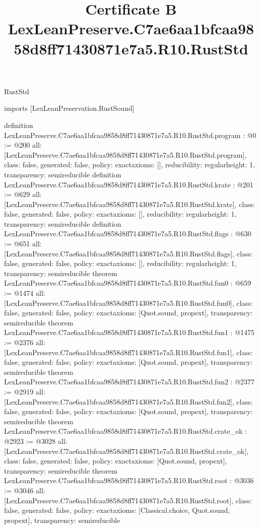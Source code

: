\begin{lexlean}{RustStd}
\title{Certificate B LexLeanPreserve.C7ae6aa1bfcaa9858d8ff71430871e7a5.R10.RustStd}
\begin{coremodule}
imports [LexLeanPreservation.RustSound]

definition LexLeanPreserve.C7ae6aa1bfcaa9858d8ff71430871e7a5.R10.RustStd.program : @0 := @200 {
  all: [LexLeanPreserve.C7ae6aa1bfcaa9858d8ff71430871e7a5.R10.RustStd.program],
  class: false,
  generated: false,
  policy: exact{axioms: []},
  reducibility: regular{height: 1},
  transparency: semireducible
}
definition LexLeanPreserve.C7ae6aa1bfcaa9858d8ff71430871e7a5.R10.RustStd.krate : @201 := @629 {
  all: [LexLeanPreserve.C7ae6aa1bfcaa9858d8ff71430871e7a5.R10.RustStd.krate],
  class: false,
  generated: false,
  policy: exact{axioms: []},
  reducibility: regular{height: 1},
  transparency: semireducible
}
definition LexLeanPreserve.C7ae6aa1bfcaa9858d8ff71430871e7a5.R10.RustStd.flags : @630 := @651 {
  all: [LexLeanPreserve.C7ae6aa1bfcaa9858d8ff71430871e7a5.R10.RustStd.flags],
  class: false,
  generated: false,
  policy: exact{axioms: []},
  reducibility: regular{height: 1},
  transparency: semireducible
}
theorem LexLeanPreserve.C7ae6aa1bfcaa9858d8ff71430871e7a5.R10.RustStd.fun0 : @659 := @1474 {
  all: [LexLeanPreserve.C7ae6aa1bfcaa9858d8ff71430871e7a5.R10.RustStd.fun0],
  class: false,
  generated: false,
  policy: exact{axioms: [Quot.sound, propext]},
  transparency: semireducible
}
theorem LexLeanPreserve.C7ae6aa1bfcaa9858d8ff71430871e7a5.R10.RustStd.fun1 : @1475 := @2376 {
  all: [LexLeanPreserve.C7ae6aa1bfcaa9858d8ff71430871e7a5.R10.RustStd.fun1],
  class: false,
  generated: false,
  policy: exact{axioms: [Quot.sound, propext]},
  transparency: semireducible
}
theorem LexLeanPreserve.C7ae6aa1bfcaa9858d8ff71430871e7a5.R10.RustStd.fun2 : @2377 := @2919 {
  all: [LexLeanPreserve.C7ae6aa1bfcaa9858d8ff71430871e7a5.R10.RustStd.fun2],
  class: false,
  generated: false,
  policy: exact{axioms: [Quot.sound, propext]},
  transparency: semireducible
}
theorem LexLeanPreserve.C7ae6aa1bfcaa9858d8ff71430871e7a5.R10.RustStd.crate_ok : @2923 := @3028 {
  all: [LexLeanPreserve.C7ae6aa1bfcaa9858d8ff71430871e7a5.R10.RustStd.crate_ok],
  class: false,
  generated: false,
  policy: exact{axioms: [Quot.sound, propext]},
  transparency: semireducible
}
theorem LexLeanPreserve.C7ae6aa1bfcaa9858d8ff71430871e7a5.R10.RustStd.root : @3036 := @3046 {
  all: [LexLeanPreserve.C7ae6aa1bfcaa9858d8ff71430871e7a5.R10.RustStd.root],
  class: false,
  generated: false,
  policy: exact{axioms: [Classical.choice, Quot.sound, propext]},
  transparency: semireducible
}


\end{coremodule}
\end{lexlean}
